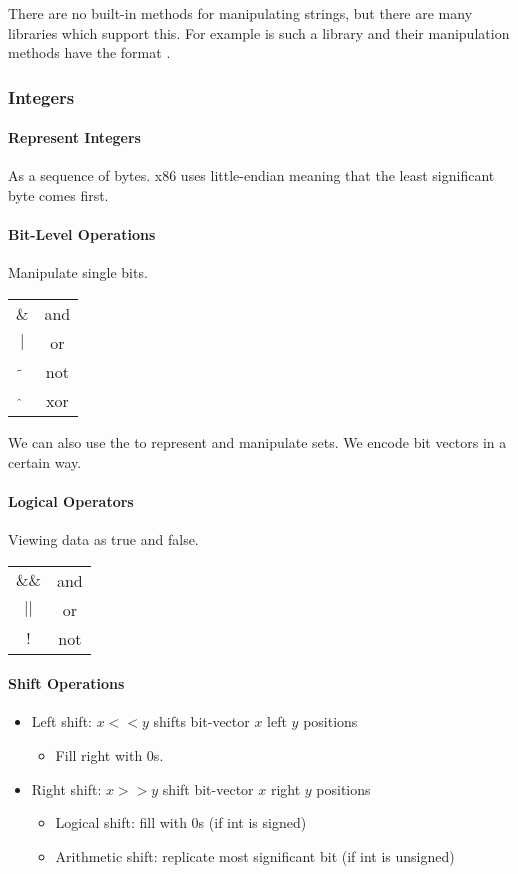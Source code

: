 There are no built-in methods for manipulating strings, but there are many libraries which support this. For example  is such a library and their manipulation methods have the format .

\subsubsection{Integers}

\paragraph{Represent Integers}
As a sequence of bytes. x86 uses little-endian meaning that the least significant byte comes first.

\paragraph{Bit-Level Operations}
Manipulate single bits.

\begin{tabular}{c | c}
    $\&$ & and\\
    $|$ & or\\
    $\tilde{}$ & not\\
    $\hat{}$ & xor
\end{tabular}

We can also use the to represent and manipulate sets. We encode bit vectors in a certain way.

\paragraph{Logical Operators}
Viewing data as true and false.

\begin{tabular}{c | c}
    $\&\&$ & and\\
    $||$ & or\\
    $!$ & not
\end{tabular}

\paragraph{Shift Operations}
\begin{itemize}
    \item Left shift: $x << y$ shifts bit-vector $x$ left $y$ positions
        \begin{itemize}
            \item Fill right with $0$s.
        \end{itemize}
    \item Right shift: $x >> y$ shift bit-vector $x$ right $y$ positions
        \begin{itemize}
            \item Logical shift: fill with $0$s (if int is signed)
            \item Arithmetic shift: replicate most significant bit (if int is unsigned)
        \end{itemize}
\end{itemize}

